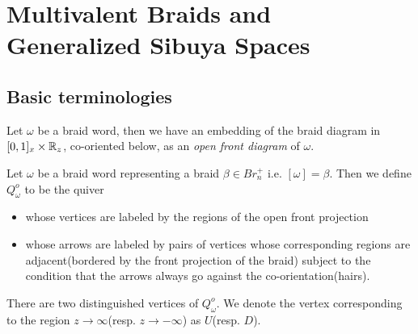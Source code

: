 \chapter{Multivalent Braids and Generalized Sibuya Spaces}
\section{Basic terminologies} 
\begin{definition}
Let $\omega$ be a braid word, then we have an embedding of the braid diagram in $[0,1]_x \times \mathbb{R}_z$, co-oriented below, as an \emph{open front diagram} of $\omega$.
\end{definition}
\begin{definition}
	Let $\omega$ be a braid word representing a braid $\beta\in Br_n^+$ i.e. $[\omega] = \beta$. Then we define $Q^o_{\omega}$ to be the quiver 
\begin{itemize}
		\item whose vertices are labeled by the regions of the open front projection
		\item whose arrows are labeled by pairs of vertices whose corresponding regions are adjacent(bordered by the front projection of the braid) subject to the condition that the arrows always go against the co-orientation(hairs).
	\end{itemize}
There are two distinguished vertices of $Q^o_\omega$. We denote the vertex corresponding to the region $z\rightarrow \infty$(resp. $z\rightarrow -\infty$) as $U$(resp. $D$).
\end{definition}

